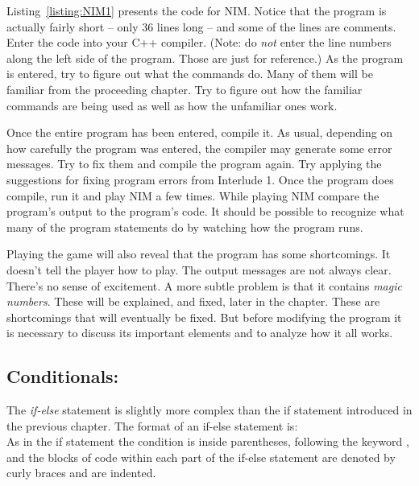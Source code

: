 Listing~\ref{listing:NIM1} presents the code for NIM.  Notice that the program is actually fairly short -- only 36 lines long -- and some of the lines are comments.  Enter the code into your C++ compiler.  (Note: do \emph{not} enter the line numbers along the left side of the program.  Those are just for reference.)  As the program is entered, try to figure out what the commands do.  Many of them will be familiar from the proceeding chapter.  Try to figure out how the familiar commands are being used as well as how the unfamiliar ones work.

Once the entire program has been entered, compile it.  As usual, depending on how carefully the program was entered, the compiler may generate some error messages.  Try to fix them and compile the program again.  Try applying the suggestions for fixing program errors from Interlude 1.
Once the program does compile, run it and play NIM a few times.  While playing NIM compare the program's output to the program's code.  It should be possible to recognize what many of the program statements do by watching how the program runs.  

Playing the game will also reveal that the program has some shortcomings.  It doesn't tell the player how to play.  The output messages are not always clear.  There's no sense of excitement.  A more subtle problem is that it contains \emph{magic numbers}.  These will be explained, and fixed, later in the chapter.  These are shortcomings that will eventually be fixed.  But before modifying the program it is necessary to discuss its important elements and to analyze how it all works.


\subsection{Conditionals: }

  The \emph{if-else} statement is slightly more complex than the
if statement introduced in the previous chapter.  The format of an if-else statement is:\\
As in the if statement the condition is inside parentheses, following the keyword , and the blocks of code within each part of the if-else statement are denoted by curly braces and are indented.  



